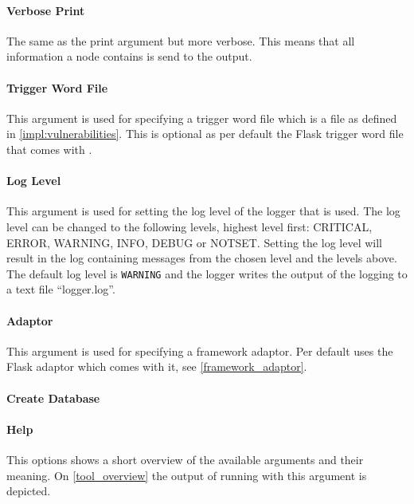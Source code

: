 \paragraph{Verbose Print}
The same as the print argument but more verbose.
This means that all information a node contains is send to the output.

\paragraph{Trigger Word File}
This argument is used for specifying a trigger word file which is a file as defined in \cref{impl:vulnerabilities}.
This is optional as per default the Flask trigger word file that comes with \pyt{}.

\paragraph{Log Level}
This argument is used for setting the log level of the logger that is used.
The log level can be changed to the following levels, highest level first: CRITICAL, ERROR, WARNING, INFO, DEBUG or NOTSET.
Setting the log level will result in the log containing messages from the chosen level and the levels above.
The default log level is \texttt{WARNING} and the logger writes the output of the logging to a text file ``logger.log''.

\paragraph{Adaptor}
This argument is used for specifying a framework adaptor.
Per default \pyt{} uses the Flask adaptor which comes with it, see \cref{framework_adaptor}.

\paragraph{Create Database}

\paragraph{Help}
This options shows a short overview of the available arguments and their meaning.
On \cref{tool_overview} the output of running \pyt{} with this argument is depicted.

